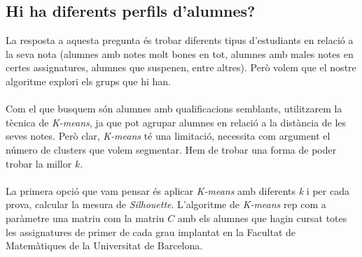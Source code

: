 \documentclass[12pt,a4paper,catalan]{article}
\begin{document}
\newpage

\subsection{Hi ha diferents perfils d'alumnes?}
La resposta a aquesta pregunta és trobar diferents tipus d'estudiants en relació a la seva nota (alumnes amb notes molt bones en tot, alumnes amb males notes en certes assignatures, alumnes que suspenen, entre altres). Però volem que el nostre algoritme explori els grups que hi han.
\\
\\
Com el que busquem són alumnes amb qualificacions semblants, utilitzarem la tècnica de \textit{K-means}, ja que pot agrupar alumnes en relació a la distància de les seves notes. Però clar, \textit{K-means} té una limitació, necessita com argument el número de clusters que volem segmentar. Hem de trobar una forma de poder trobar la millor $k$.
\\
\\
La primera opció que vam pensar és aplicar \textit{K-means} amb diferents \textit{k} i per cada prova, calcular la mesura de \textit{Silhouette}. L'algoritme de \textit{K-means} rep com a paràmetre una matriu com la matriu $C$ amb els alumnes que hagin cursat totes les assignatures de primer de cada grau implantat en la Facultat de Matemàtiques de la Universitat de Barcelona. 
\end{document}
